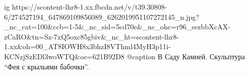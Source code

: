  
 
 
 
 

\ifcmt
  ig https://scontent-lhr8-1.xx.fbcdn.net/v/t39.30808-6/274527194_647869109856089_6262019951107272145_n.jpg?_nc_cat=100&ccb=1-5&_nc_sid=5cd70e&_nc_ohc=r96_sezbbXcAX-zCaRO&tn=Sz-7xQ5oxc85gbiv&_nc_ht=scontent-lhr8-1.xx&oh=00_AT8IOWH8x3bhzI8VThml4MyH3p11i-KCNzjSzEDl3woWTQ&oe=621B92D8
	@caption В Саду Камней. Скульптура \enquote{Фея с крыльями бабочки}.
\fi
